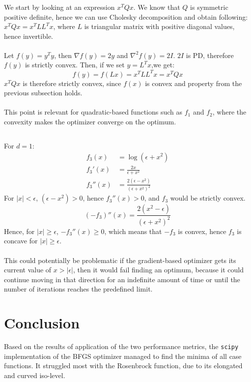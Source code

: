 \documentclass[a4paper]{article}
\begin{document}
\subsubsection{}
We start by looking at an expression $x^TQx$. We know that $Q$ is symmetric
positive definite, hence we can use Cholesky decomposition and obtain following:
$x^TQx = x^TLL^Tx$, where $L$ is triangular matrix with positive diagonal
values, hence invertible.\\\\
Let $f(y) = y^Ty$, then $\nabla f(y) = 2y$ and $\nabla^2 f(y) = 2I$. $2I$ is
PD, therefore $f(y)$ is strictly convex. Then, if we set $y=L^Tx$,we get:
\[
f(y) = f(Lx) = x^TLL^Tx = x^TQx
\]
$x^TQx$ is therefore strictly convex, since $f(x)$ is convex and 
property from the previous subsection holds. \\\\
This point is relevant for quadratic-based functions such as $f_1$ and $f_2$,
where the convexity makes the optimizer converge on the optimum.

\subsection{}
\subsubsection{}
For $d=1$:
\begin{align*}
f_3(x) &= \log(\epsilon + x^2) \\
f_3'(x) &= \frac{2x}{\epsilon + x^2} \\
f_3''(x) &= \frac{2(\epsilon - x^2)}{(\epsilon + x^2)^2}
\end{align*}
For $|x| < \epsilon$, $(\epsilon - x^2) > 0$, hence $f_3''(x) > 0$, and $f_3$
would be strictly convex.
\[
(-f_3)''(x) = \frac{2(x^2 - \epsilon)}{(\epsilon + x^2)^2}
\]
Hence, for $|x| \geq \epsilon$, $-f_3''(x) \geq 0$, which means that $-f_3$ is
convex, hence $f_3$ is concave for $|x| \geq \epsilon$.\\\\
This could potentially be problematic if the gradient-based optimizer gets its current value of
$x>|\epsilon|$, then it would fail finding an optimum, because it could continue
moving in that direction for an indefinite amount of time or until the number of
iterations reaches the predefined limit. 

\section{Conclusion}
Based on the results of application of the two performance metrics, the
\texttt{scipy} implementation of the BFGS optimizer managed to find the minima
of all case functions. It struggled most with the Rosenbrock function, due to its
elongated and curved iso-level.
\end{document}
